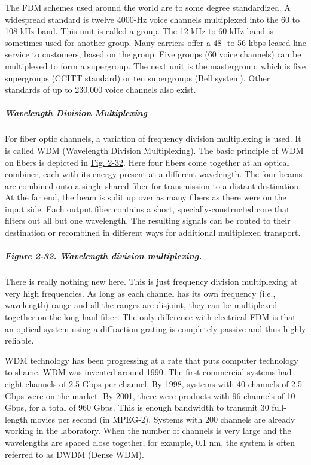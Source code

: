 \documentclass[b5paper,11pt]{memoir}
\begin{document}

The FDM schemes used around the world are to some degree standardized. A
widespread standard is twelve 4000-Hz voice channels multiplexed into
the 60 to 108 kHz band. This unit is called a {group.} The 12-kHz to
60-kHz band is sometimes used for another group. Many carriers offer a
48- to 56-kbps leased line service to customers, based on the group.
Five groups (60 voice channels) can be multiplexed to form a
{supergroup}. The next unit is the {mastergroup}, which is five
supergroups (CCITT standard) or ten supergroups (Bell system). Other
standards of up to 230,000 voice channels also exist.

\protect\hypertarget{0130661023_ch02lev1sec5.htmlux5cux23ch02lev3sec13}{}{}

\subparagraph{Wavelength Division Multiplexing}

For fiber optic channels, a variation of frequency division multiplexing
is used. It is called {WDM} ({Wavelength Division Multiplexing}). The
basic principle of WDM on fibers is depicted in
\protect\hyperlink{0130661023_ch02lev1sec5.htmlux5cux23ch02fig32}{Fig.
2-32}. Here four fibers come together at an optical combiner, each with
its energy present at a different wavelength. The four beams are
combined onto a single shared fiber for transmission to a distant
destination. At the far end, the beam is split up over as many fibers as
there were on the input side. Each output fiber contains a short,
specially-constructed core that filters out all but one wavelength. The
resulting signals can be routed to their destination or recombined in
different ways for additional multiplexed transport.

\subparagraph[Figure 2-32. Wavelength division
multiplexing.]{\texorpdfstring{\protect\hypertarget{0130661023_ch02lev1sec5.htmlux5cux23ch02fig32}{}{}Figure
2-32. Wavelength division
multiplexing.}{Figure 2-32. Wavelength division multiplexing.}}


There is really nothing new here. This is just frequency division
multiplexing at very high frequencies. As long as each channel has its
own frequency (i.e., wavelength) range and all the ranges are disjoint,
they can be multiplexed together on the long-haul fiber. The only
difference with electrical FDM is that an optical system using a
diffraction grating is completely passive and thus highly reliable.

WDM technology has been progressing at a rate that puts computer
technology to shame. WDM was invented around 1990. The first commercial
systems had eight channels of 2.5 Gbps per channel. By 1998, systems
with 40 channels of 2.5 Gbps were on the market. By 2001, there were
products with 96 channels of 10 Gbps, for a total of 960 Gbps. This is
enough bandwidth to transmit 30 full-length movies per second (in
MPEG-2). Systems with 200 channels are already working in the
laboratory. When the number of channels is very large and the
wavelengths are spaced close together, for example, 0.1 nm, the system
is often referred to as {DWDM} ({Dense WDM}).
\end{document}
